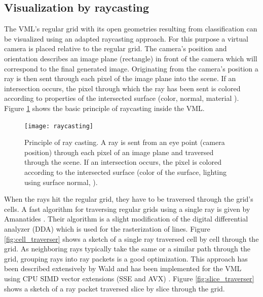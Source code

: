 \subsection{Visualization by raycasting}
\label{sec:raycasting}

The VML's regular grid with its open geometries resulting from classification can be visualized using an adapted raycasting approach.
For this purpose a virtual camera is placed relative to the regular grid.
The camera's position and orientation describes an image plane (rectangle) in front of the camera which will correspond to the final generated image.
Originating from the camera's position a ray is then sent through each pixel of the image plane into the scene.
If an intersection occurs, the pixel through which the ray has been sent is colored according to properties of the intersected surface (color, normal, material \etc).
Figure \ref{fig:raycasting_principle} shows the basic principle of raycasting inside the VML.

\begin{figure}
	\centering
	\texttt{[image: raycasting]}
	\caption{
		Principle of ray casting.
		A ray is sent from an eye point (\ie camera position) through each pixel of an image plane and traversed through the scene.
		If an intersection occurs, the pixel is colored according to the intersected surface (\protect\eg color of the surface, lighting using surface normal, \protect\etc).
	}
	\label{fig:raycasting_principle}
\end{figure}

When the rays hit the regular grid, they have to be traversed through the grid's cells.
A fast algorithm for traversing regular grids using a single ray is given by Amanatides \etal \cite{3DDDA}.
Their algorithm is a slight modification of the digital differential analyzer (DDA) which is used for the rasterization of lines.
Figure \ref{fig:cell_traverser} shows a sketch of a single ray traversed cell by cell through the grid.
%
As neighboring rays typically take the same or a similar path through the grid, grouping rays into ray packets is a good optimization.
This approach has been described extensively by Wald \etal \cite{packet_caster} and has been implemented for the VML using CPU SIMD vector extensions (SSE and AVX) \cite{enlight}.
Figure \ref{fig:slice_traverser} shows a sketch of a ray packet traversed slice by slice through the grid.

